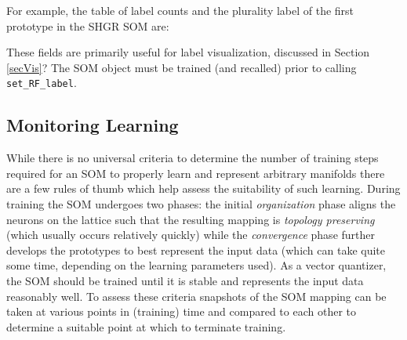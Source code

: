 \documentclass[]{article}
\newenvironment{Shaded}{\begin{snugshade}}{\end{snugshade}}
\newcommand{\CommentTok}[1]{\textcolor[rgb]{0.56,0.35,0.01}{\textit{#1}}}
\newcommand{\DecValTok}[1]{\textcolor[rgb]{0.00,0.00,0.81}{#1}}
\newcommand{\NormalTok}[1]{#1}
\newcommand{\OperatorTok}[1]{\textcolor[rgb]{0.81,0.36,0.00}{\textbf{#1}}}
\begin{document}
For example, the table of label counts and the plurality label of the first prototype in the SHGR SOM are:

\begin{Shaded}
\end{Shaded}

These fields are primarily useful for label visualization, discussed in Section \ref{secVis}? The SOM object must be trained (and recalled) prior to calling \texttt{set\_RF\_label}.

\hypertarget{monitoring-learning}{%
\subsection{Monitoring Learning}\label{monitoring-learning}}

While there is no universal criteria to determine the number of training steps required for an SOM to properly learn and represent arbitrary manifolds there are a few rules of thumb which help assess the suitability of such learning. During training the SOM undergoes two phases: the initial \emph{organization} phase aligns the neurons on the lattice such that the resulting mapping is \emph{topology preserving} (which usually occurs relatively quickly) while the \emph{convergence} phase further develops the prototypes to best represent the input data (which can take quite some time, depending on the learning parameters used). As a vector quantizer, the SOM should be trained until it is stable and represents the input data reasonably well. To assess these criteria snapshots of the SOM mapping can be taken at various points in (training) time and compared to each other to determine a suitable point at which to terminate training.
\end{document}
